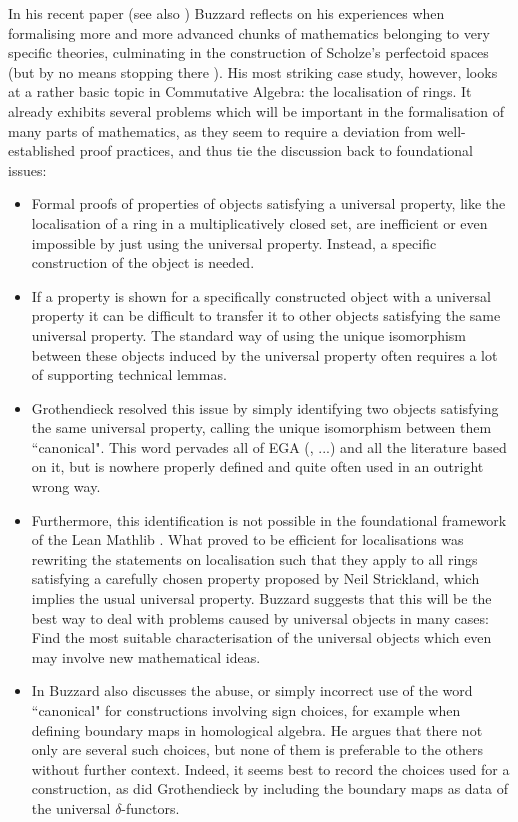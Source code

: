 \documentclass{amsart}
\theoremstyle{plain}
\numberwithin{equation}{section} %
\numberwithin{figure}{section} %
\theoremstyle{plain}
\theoremstyle{plain}
\theoremstyle{plain}
\theoremstyle{plain}
\theoremstyle{plain}
\theoremstyle{plain}
\theoremstyle{remark}
\theoremstyle{remark}
\theoremstyle{remark}
\begin{document}
In his recent paper \cite{Buz24} (see also \cite{BHL+22}) Buzzard reflects on his experiences when formalising more and more advanced chunks of mathematics belonging to very specific theories, culminating in the construction of Scholze's perfectoid spaces \cite{BCM19} (but by no means stopping there \cite[Fermat's Last Theorem]{BuzXena}). His most striking case study, however, looks at a rather basic topic in Commutative Algebra: the localisation of rings. It already exhibits several problems which will be important in the formalisation of many parts of mathematics, as they seem to require a deviation from well-established proof practices, and thus tie the discussion back to foundational issues:
\begin{itemize}
\item Formal proofs of properties of objects satisfying a universal property, like the localisation of a ring in a multiplicatively closed set, are inefficient or even impossible by just using the universal property. Instead, a specific construction of the object is needed.
\item If a property is shown for a specifically constructed object with a universal property it can be difficult to transfer it to other objects  satisfying the same universal property. The standard way of using the unique isomorphism between these objects induced by the universal property often requires a lot of supporting technical lemmas.
\item Grothendieck resolved this issue by simply identifying two objects satisfying the same universal property, calling the unique isomorphism between them ``canonical". This word pervades all of EGA (\cite{EGAIn}, ...) and all the literature based on it, but is nowhere properly defined and quite often used in an outright wrong way. 
\item Furthermore, this identification is not possible in the foundational framework of the Lean Mathlib \cite{Mathlib}. What proved to be efficient for localisations was rewriting the statements on localisation such that they apply to all rings satisfying a carefully chosen property proposed by Neil Strickland, which implies the usual universal property. Buzzard suggests that this will be the best way to deal with problems caused by universal objects in many cases: Find the most suitable characterisation of the universal objects which even may involve new mathematical ideas.
\item In \cite[Sec.~8]{Buz24} Buzzard also discusses the abuse, or simply incorrect use of the word ``canonical" for constructions involving sign choices, for example when defining boundary maps in homological algebra. He argues that there not only are several such choices, but none of them is preferable to the others without further context. Indeed, it seems best to record the choices used for a construction, as did Grothendieck by including the boundary maps as data of the universal $\delta$-functors. 
\end{itemize}
\end{document}

